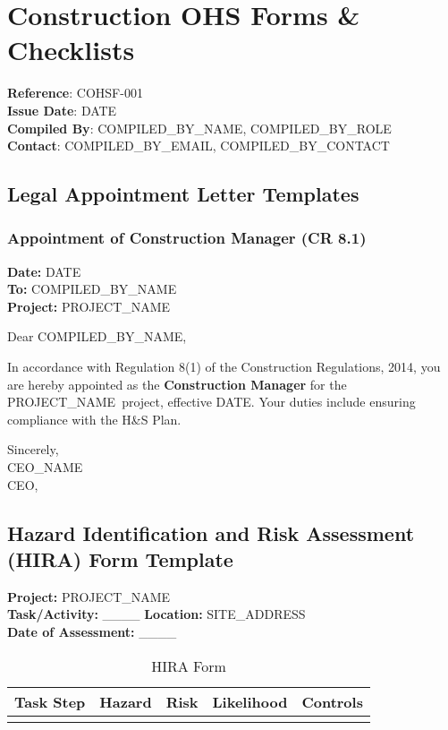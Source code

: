 \documentclass[11pt]{article}
\newcommand{\docTitle}{Construction OHS Forms \& Checklists}
\newcommand{\refNumber}{COHSF-001}
\newcommand{\issueDate}{{{DATE}}}
\newcommand{\projectName}{{{PROJECT_NAME}}}
\newcommand{\siteAddress}{{{SITE_ADDRESS}}}
\newcommand{\compilerName}{{{COMPILED_BY_NAME}}}
\newcommand{\compilerRole}{{{COMPILED_BY_ROLE}}}
\newcommand{\compilerEmail}{{{COMPILED_BY_EMAIL}}}
\newcommand{\compilerPhone}{{{COMPILED_BY_CONTACT}}}
\begin{document}
\section*{\docTitle}
\textbf{Reference}: \refNumber \\
\textbf{Issue Date}: \issueDate \\
\textbf{Compiled By}: \compilerName, \compilerRole \\
\textbf{Contact}: \compilerEmail, \compilerPhone

\subsection*{Legal Appointment Letter Templates}

\subsubsection*{Appointment of Construction Manager (CR 8.1)}
\textbf{Date:} \issueDate \\
\textbf{To:} \compilerName \\
\textbf{Project:} \projectName

Dear \compilerName,

In accordance with Regulation 8(1) of the Construction Regulations, 2014, you are hereby appointed as the \textbf{Construction Manager} for the \projectName\ project, effective \issueDate. Your duties include ensuring compliance with the H\&S Plan.

Sincerely,\\
{{CEO_NAME}}\\
CEO, \clientName

\subsection*{Hazard Identification and Risk Assessment (HIRA) Form Template}

\textbf{Project:} \projectName \\
\textbf{Task/Activity:} \_\_\_\_ \textbf{Location:} \siteAddress \\
\textbf{Date of Assessment:} \_\_\_\_

\begin{table}[h]
    \centering
    \begin{tabular}{p{2cm}p{3cm}p{3cm}p{3cm}p{3cm}}
        \toprule
        \textbf{Task Step} & \textbf{Hazard} & \textbf{Risk} & \textbf{Likelihood} & \textbf{Controls} \\
        \midrule
        & & & & \\
        \bottomrule
    \end{tabular}
    \caption{HIRA Form}
\end{table}
\end{document}
